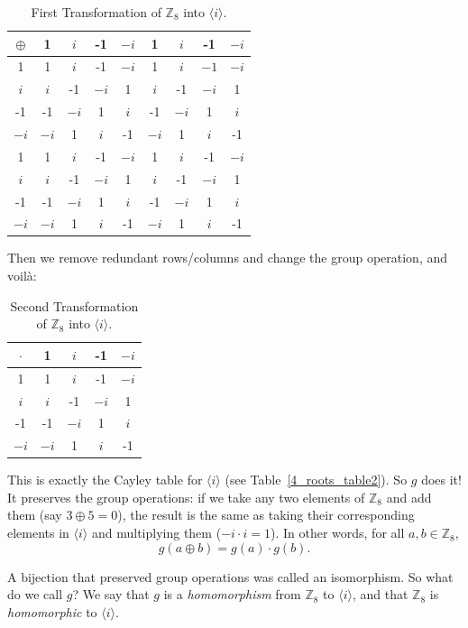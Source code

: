 \begin{example}
\begin{table}[H]
\caption{\label{groups_Z8_transfom1}First Transformation of ${\mathbb Z}_8$ into $\langle i \rangle$.}{\small
\begin{center}
\begin{tabular}{c|cccccccc}
$\oplus$ & 1 &$i$ & -1 & $-i$ & 1 & $i$ & -1 & $-i$ \\
\hline
1        & 1 & $i$ & -1 & $-i$ & 1 & $i$ & $-1$ & $-i$ \\
$i$       &$i$ & -1 & $-i$ & 1 & $i$ & -1 & $-i$ & 1 \\
-1       & -1 & $-i$ & 1 & $i$ & -1 & $-i$ & 1 & $i$\\
$-i$       & $-i$ & 1 & $i$ & -1 & $-i$ & 1 & $i$ & -1\\
1        & 1 & $i$ & -1 & $-i$ & 1 & $i$ & -1 & $-i$ \\
$i$       & $i$ & -1 & $-i$ & 1 & $i$ & -1 & $-i$ & 1 \\
-1       & -1 & $-i$ & 1 & $i$ & -1 & $-i$ & 1 & $i$\\
$-i$       & $-i$ & 1 & $i$ & -1 & $-i$ & 1 & $i$ & -1\\
\end{tabular}
\end{center}
}
\end{table}

Then we remove redundant rows/columns and change the group operation, and voil\`{a}:

\begin{table}[H]
\caption{\label{groups_Z8_transfom2}Second Transformation of ${\mathbb Z}_8$ into $\langle i \rangle$.}{\small
\begin{center}
\begin{tabular}{c|cccc}
$\cdot$ & 1 & $i$ & -1 & $-i$ \\
\hline
1        & 1 & $i$ & -1 & $-i$ \\
$i$       &$i$ & -1 & $-i$ & 1 \\
-1       & -1 & $-i$ & 1 & $i$ \\
$-i$       & $-i$ & 1 & $i$ & -1 \\

\end{tabular}
\end{center}
}
\end{table}

\noindent
This is exactly the Cayley table for  $\langle i \rangle$ (see Table~\ref{4_roots_table2}).  So $g$ does it! It preserves the group operations: if we take any two elements of ${\mathbb Z}_8$ and add them (say $3 \oplus 5 = 0$), the result is the same as taking their corresponding elements in $\langle i \rangle$ and multiplying them ($ -i \cdot i = 1$).  In other words, for all $a,b \in {\mathbb Z}_8$, 
\[
g(a \oplus b) = g(a) \cdot g(b).
\]
 
A bijection that preserved group operations was called an isomorphism.  So what do we call $g$?  We say that $g$ is a \emph{homomorphism} from ${\mathbb Z}_8$ to $\langle i \rangle$, and that ${\mathbb Z}_8$ is \emph{homomorphic} to $\langle i \rangle$.
\end{example}

